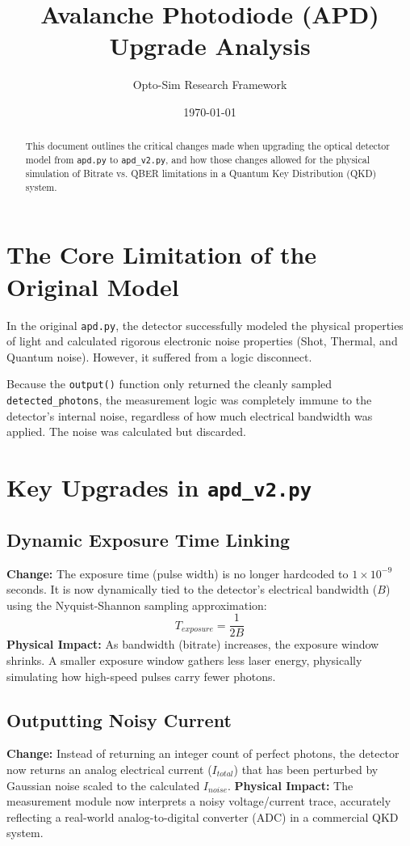 \documentclass[12pt,a4paper]{article}
\title{Avalanche Photodiode (APD) Upgrade Analysis}
\author{Opto-Sim Research Framework}
\date{\today}
\begin{document}
\maketitle

\begin{abstract}
This document outlines the critical changes made when upgrading the optical detector model from \texttt{apd.py} to \texttt{apd\_v2.py}, and how those changes allowed for the physical simulation of Bitrate vs. QBER limitations in a Quantum Key Distribution (QKD) system.
\end{abstract}

\section{The Core Limitation of the Original Model}
In the original \texttt{apd.py}, the detector successfully modeled the physical properties of light and calculated rigorous electronic noise properties (Shot, Thermal, and Quantum noise). However, it suffered from a logic disconnect. 

Because the \texttt{output()} function only returned the cleanly sampled \texttt{detected\_photons}, the measurement logic was completely immune to the detector's internal noise, regardless of how much electrical bandwidth was applied. The noise was calculated but discarded.

\section{Key Upgrades in \texttt{apd\_v2.py}}

\subsection{Dynamic Exposure Time Linking}
\textbf{Change:} The exposure time (pulse width) is no longer hardcoded to $1 \times 10^{-9}$ seconds. It is now dynamically tied to the detector's electrical bandwidth ($B$) using the Nyquist-Shannon sampling approximation:
\begin{equation}
T_{exposure} = \frac{1}{2B}
\end{equation}
\textbf{Physical Impact:} As bandwidth (bitrate) increases, the exposure window shrinks. A smaller exposure window gathers less laser energy, physically simulating how high-speed pulses carry fewer photons.

\subsection{Outputting Noisy Current}
\textbf{Change:} Instead of returning an integer count of perfect photons, the detector now returns an analog electrical current ($I_{total}$) that has been perturbed by Gaussian noise scaled to the calculated $I_{noise}$.
\textbf{Physical Impact:} The measurement module now interprets a noisy voltage/current trace, accurately reflecting a real-world analog-to-digital converter (ADC) in a commercial QKD system.
\end{document}
